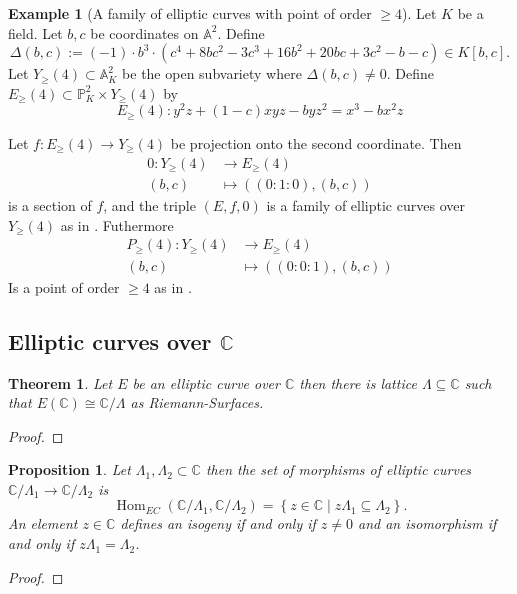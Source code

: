 \documentclass[a4paper,12pt,reqno]{amsart}
\newcommand{\set}[1]{\left\lbrace #1 \right\rbrace}
\newcommand{\field}[1]{\mathbb{#1}}  %
\newcommand{\C}{\field{C}} %
\newcommand{\A}{\field{A}}
\renewcommand{\P}{\field{P}}
\DeclareMathOperator{\Hom}{Hom}
\newtheorem{theorem}[lemma]{Theorem}
\newtheorem{proposition}[lemma]{Proposition}
\theoremstyle{definition}
\newtheorem{example}[lemma]{Example}
\numberwithin{lemma}{section}
\numberwithin{equation}{section}
\numberwithin{figure}{section}
\begin{document}
\begin{example}[A family of elliptic curves with point of order $\geq 4$]
	Let $K$ be a field. Let $b,c$ be coordinates on $\A^2$. Define $$\Delta(b,c) :=  \left(-1\right) \cdot b^{3} \cdot (c^{4} + 8 b c^{2} - 3 c^{3} + 16 b^{2} + 20 b c + 3 c^{2} - b - c) \in K[b,c].$$ Let $Y_{\geq }(4) \subset \A^2_K$ be the open subvariety where $\Delta(b,c) \neq 0$. Define $E_\geq(4) \subset \P^2_K \times Y_{\geq }(4)$ by $$E_{\geq}(4) : y^2z+(1-c)xyz-byz^2=x^3-bx^2z$$
\begin{comment}
R.<b,c> = QQ[]
E = EllipticCurve(R.fraction_field()[1-c,b,b,0,0])
E.discriminant().factor()
\end{comment}
Let $f : E_{\geq}(4) \to Y_{\geq}(4)$ be projection onto the second coordinate. Then \begin{align*}
0: Y_{\geq}(4) &\to E_{\geq}(4) \\
(b,c) &\mapsto ((0:1:0),(b,c))
\end{align*}
is a section of $f$, and the triple $(E,f,0)$ is a family of elliptic curves over $Y_{\geq}(4)$ as in . Futhermore
\begin{align*}
P_{\geq}(4): Y_{\geq}(4) &\to E_{\geq}(4) \\
(b,c) &\mapsto ((0:0:1),(b,c))
\end{align*}
Is a point of order $\geq 4$ as in .

\end{example}

\subsection{Elliptic curves over $\C$}
\begin{theorem}\label{stmt:complex-ec-is-C-mod-lattice}
	Let $E$ be an elliptic curve over $\C$ then there is lattice $\Lambda \subseteq \C$ such that $E(\C) \cong \C/\Lambda$ as Riemann-Surfaces.
\end{theorem}
\begin{proof}
\end{proof}

\begin{proposition}
	Let $\Lambda_1, \Lambda_2 \subset \C$ then the set of morphisms of elliptic curves $\C/\Lambda_1 \to \C/\Lambda_2$ is $$\Hom_{EC}(\C/\Lambda_1,\C/\Lambda_2) =\set{z \in \C \mid z\Lambda_1 \subseteq \Lambda_2}.$$ 
	An element $z \in \C$ defines an isogeny if and only if $z \neq 0$ and an isomorphism if and only if $z\Lambda_1 = \Lambda_2$.
\end{proposition}
\begin{proof}
\end{proof}
\end{document}
